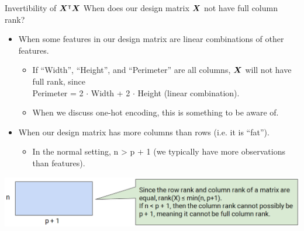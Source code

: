 \documentclass[aspectratio=169]{../latex_main/tntbeamer}  %
\begin{document}
	
	\begin{frame}{Invertibility of  $\bm{X}^\intercal\bm{X}$ }
	    When does our design matrix    $\bm{X}$   not have full column rank?
	    \begin{itemize}
	        \item When some features in our design matrix are linear combinations of other features.
	        \begin{itemize}
	            \item If “Width”, “Height”, and “Perimeter” are all columns, $\bm{X}$ will not have full rank, since\\ Perimeter = 2 $\cdot$ Width + 2 $\cdot$ Height (linear combination).
	            \item When we discuss one-hot encoding, this is something to be aware of.
	        \end{itemize}
	        \item  When our design matrix has more columns than rows (i.e. it is “fat”).
	        \begin{itemize}
	            \item In the normal setting, n > p + 1 (we typically have more observations than features). 
	        \end{itemize}
	    \end{itemize}
	    \includegraphics[scale=.45]{Bild16}
	\end{frame}
\end{document}
